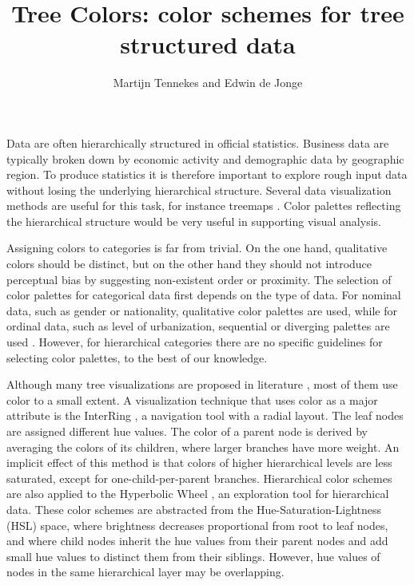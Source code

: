 \documentclass[journal]{vgtc}                %
\title{Tree Colors: color schemes for tree structured data}
\author{Martijn Tennekes and Edwin de Jonge}
\begin{document}
\lstset{language=R}


\maketitle

Data are often hierarchically structured in official statistics. Business data are typically broken down by economic activity and demographic data by geographic region. To produce statistics it is therefore important to explore rough input data without losing the underlying hierarchical structure. Several data visualization methods are useful for this task, for instance treemaps
\cite{shneiderman1992,tennekes2011b}. Color palettes reflecting the hierarchical structure would be very useful in supporting visual analysis.

Assigning colors to categories is far from trivial. On the one hand, qualitative colors should be distinct, but on the other hand they should not introduce perceptual bias by suggesting non-existent order or proximity. The selection of color palettes for categorical data first depends on the type of data. For nominal data, such as gender or nationality, qualitative color palettes are used, while for ordinal data, such as level of urbanization, sequential or diverging palettes are used \cite{brewer03, zeileis2009}. However, for hierarchical categories there are no specific guidelines for selecting color palettes, to the best of our knowledge.

Although many tree visualizations are proposed in literature \cite{schulz2011}, most of them use color to a small extent. A visualization technique that uses color as a major attribute is the InterRing \cite{yang2002}, a navigation tool with a radial layout. The leaf nodes are assigned different hue values. The color of a parent node is derived by averaging the colors of its children, where larger branches have more weight. An implicit effect of this method is that colors of higher hierarchical levels are less saturated, except for one-child-per-parent branches. Hierarchical color schemes are also applied to the Hyperbolic Wheel \cite{lam2012}, an exploration tool for hierarchical data.  These color schemes are abstracted from the Hue-Saturation-Lightness (HSL) space, where brightness decreases proportional from root to leaf nodes, and where child nodes inherit the hue values from their parent nodes and add small hue values to distinct them from their siblings. However, hue values of nodes in the same hierarchical layer may be overlapping.
\end{document}
